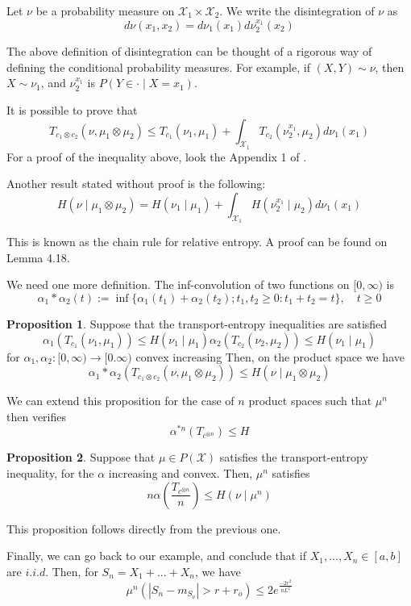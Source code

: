 \documentclass[10pt]{article}
\theoremstyle{definition}
\newtheorem{proposition}{Proposition}
\begin{document}
Let $\nu$ be a probability measure on $\mathcal X_1 \times \mathcal X_2$. We write
the disintegration of $\nu$ as
\begin{equation}
	d\nu(x_1,x_2)	 = d\nu_1(x_1)d\nu_2^{x_1}(x_2)
\end{equation}

The above definition of disintegration can be thought of a rigorous way of defining
the conditional probability measures. For example, if $(X,Y) \sim \nu$,
then $X \sim \nu_1$, and 
$\nu_2^{x_1}$ is $P(Y \in \cdot \mid X = x_1)$.

It is possible to prove that
\begin{equation}
	T_{c_1 \otimes c_2}	(\nu, \mu_1 \otimes \mu_2) \leq
	T_{c_1}	(\nu_1, \mu_1) + \int_{\mathcal X_1} T_{c_2}(\nu_2^{x_1},\mu_2)d\nu_1(x_1)
\end{equation}
For a proof of the inequality above, look the Appendix 1 of \citet{gozlan2010transport}.

Another result stated without proof is the following:
\begin{equation}
	H(\nu\mid \mu_1 \otimes \mu_2)	= H(\nu_1 \mid \mu_1)
	+ \int_{\mathcal X_1} H(\nu_2^{x_1}\mid \mu_2)d\nu_1(x_1)
\end{equation}

This is known as the chain rule for relative entropy. A proof can be found on
\citet{van2014probability} Lemma 4.18.

We need one more definition. The inf-convolution of two functions on $[0,\infty)$ is
$$
\alpha_1 * \alpha_2(t) := \inf\{
\alpha_1(t_1) + \alpha_2(t_2) ; t_1, t_2 \geq 0: t_1 + t_2 = t
\}, \quad t\geq 0
$$

\begin{proposition}
	Suppose that the transport-entropy inequalities are satisfied
	$$
	\alpha_1(T_{c_1}(\nu_1,\mu_1)) \leq H(\nu_1 \mid \mu_1)
	\alpha_2(T_{c_2}(\nu_2,\mu_2)) \leq H(\nu_1 \mid \mu_1)
	$$
	for $\alpha_1, \alpha_2 : [0,\infty) \rightarrow [0.\infty)$ convex increasing
	Then, on the product space we have
	$$
	\alpha_1*\alpha_2(T_{c_1\otimes c_2}(\nu,\mu_1\otimes \mu_2))
	\leq H(\nu \mid \mu_1 \otimes \mu_2)
	$$
\end{proposition}

We can extend this proposition for the case of $n$ product spaces such that $\mu^n$
then verifies
$$
\alpha^{*n}(T_{c^{\otimes n}}) \leq H
$$

\begin{proposition} Suppose that $\mu \in P(\mathcal X)$ satisfies the
transport-entropy inequality, for the $\alpha$ increasing and convex. Then,
$\mu^n$ satisfies
$$
n\alpha
\left(\frac{T_{c^{\otimes n}}}{n}
\right) \leq H(\nu \mid \mu^n)
$$
\end{proposition}
This proposition follows directly from the previous one.

Finally, we can go back to our example, and conclude that if $X_1,...,X_n \in [a,b]$ are
$i.i.d$. Then, for $S_n = X_1 + ... + X_n$, we have
	$$
	\mu^n(|S_n - m_{S_\nu} | > r + r_o) \leq 2 e^{\frac{- 2r^2}{n L^2}}
	$$



  
  
\end{document}
